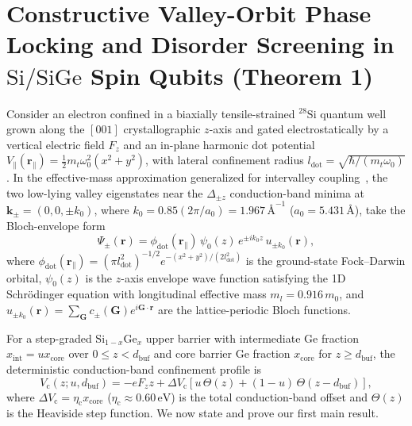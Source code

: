 \documentclass[11pt,letterpaper]{article}
\theoremstyle{definition}
\begin{document}
\section{Constructive Valley-Orbit Phase Locking and Disorder Screening in $\mathrm{Si/SiGe}$ Spin Qubits (Theorem 1)}
\label{sec:theorem1}

Consider an electron confined in a biaxially tensile-strained ${}^{28}\mathrm{Si}$ quantum well grown along the $[001]$ crystallographic $z$-axis and gated electrostatically by a vertical electric field $F_z$ and an in-plane harmonic dot potential $V_\parallel(\mathbf{r}_\parallel) = \frac{1}{2}m_t \omega_0^2(x^2 + y^2)$, with lateral confinement radius $l_{\mathrm{dot}} = \sqrt{\hbar/(m_t \omega_0)}$. In the effective-mass approximation generalized for intervalley coupling~\cite{Friesen2007, Saraiva2009}, the two low-lying valley eigenstates near the $\Delta_{\pm z}$ conduction-band minima at $\mathbf{k}_{\pm} = (0, 0, \pm k_0)$, where $k_0 = 0.85(2\pi/a_0) = 1.967\,\text{\AA}^{-1}$ ($a_0 = 5.431\,\text{\AA}$), take the Bloch-envelope form
\begin{equation}
  \Psi_{\pm}(\mathbf{r}) = \phi_{\mathrm{dot}}(\mathbf{r}_\parallel) \, \psi_0(z) \, e^{\pm i k_0 z} \, u_{\pm k_0}(\mathbf{r}),
  \label{eq:bloch_envelope_states}
\end{equation}
where $\phi_{\mathrm{dot}}(\mathbf{r}_\parallel) = (\pi l_{\mathrm{dot}}^2)^{-1/2} e^{-(x^2+y^2)/(2l_{\mathrm{dot}}^2)}$ is the ground-state Fock--Darwin orbital, $\psi_0(z)$ is the $z$-axis envelope wave function satisfying the 1D Schr\"odinger equation with longitudinal effective mass $m_l = 0.916\,m_0$, and $u_{\pm k_0}(\mathbf{r}) = \sum_{\mathbf{G}} c_{\pm}(\mathbf{G}) e^{i\mathbf{G}\cdot\mathbf{r}}$ are the lattice-periodic Bloch functions.

For a step-graded $\mathrm{Si}_{1-x}\mathrm{Ge}_x$ upper barrier with intermediate Ge fraction $x_{\mathrm{int}} = u x_{\mathrm{core}}$ over $0 \le z < d_{\mathrm{buf}}$ and core barrier Ge fraction $x_{\mathrm{core}}$ for $z \ge d_{\mathrm{buf}}$, the deterministic conduction-band confinement profile is
\begin{equation}
  V_{\mathrm{c}}(z; u, d_{\mathrm{buf}}) = -e F_z z + \Delta V_{\mathrm{c}} \left[ u \, \Theta(z) + (1 - u) \, \Theta(z - d_{\mathrm{buf}}) \right],
  \label{eq:step_graded_vc}
\end{equation}
where $\Delta V_{\mathrm{c}} = \eta_{\mathrm{c}} x_{\mathrm{core}}$ ($\eta_{\mathrm{c}} \approx 0.60\,\mathrm{eV}$) is the total conduction-band offset and $\Theta(z)$ is the Heaviside step function. We now state and prove our first main result.
\end{document}
